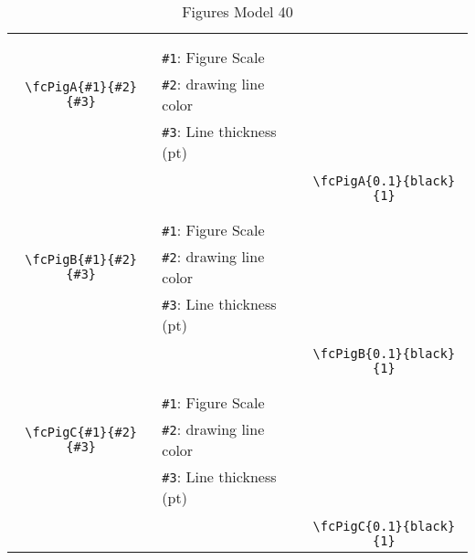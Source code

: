 \documentclass[x11names]{article}
\begin{document}
\begin{table}[H]
\begin{tabular}{|c|l|c|}
	&&\multirow{5}{*}{\fcPigA{0.1}{black}{1}}\\	&&\\	&\verb|#1|: Figure Scale &\\	\verb|\fcPigA{#1}{#2}{#3}|&	\verb|#2|: drawing line color &\\	&\verb|#3|: Line thickness (pt) &\\ &&\\&&	\verb|\fcPigA{0.1}{black}{1}|\\\hline 	
	&&\multirow{5}{*}{\fcPigB{0.1}{black}{1}}\\	&&\\	&\verb|#1|: Figure Scale &\\	\verb|\fcPigB{#1}{#2}{#3}|&	\verb|#2|: drawing line color &\\	&\verb|#3|: Line thickness (pt) &\\ &&\\&&	\verb|\fcPigB{0.1}{black}{1}|\\\hline 	
	&&\multirow{5}{*}{\fcPigC{0.1}{black}{1}}\\	&&\\	&\verb|#1|: Figure Scale &\\	\verb|\fcPigC{#1}{#2}{#3}|&	\verb|#2|: drawing line color &\\	&\verb|#3|: Line thickness (pt) &\\ &&\\&&	\verb|\fcPigC{0.1}{black}{1}|\\\hline 	\hline\end{tabular}\caption{Figures Model 40}\label{tab40}\end{table}
\end{document}
